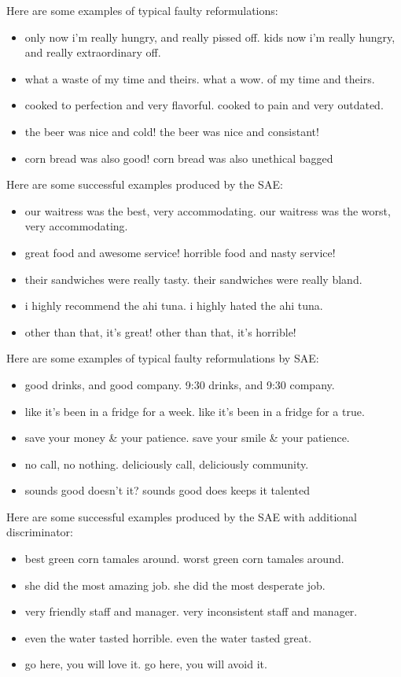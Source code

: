 \documentclass[11pt,a4paper]{article}
\begin{document}
Here are some examples of typical faulty reformulations:
\begin{itemize}
\item only now i'm really hungry, and really pissed off.   kids now i'm really hungry, and really extraordinary off.
\item what a waste of my time and theirs.  what a wow. of my time and theirs.
\item cooked to perfection and very flavorful.  cooked to pain and very outdated.
\item the beer was nice and cold!  the beer was nice and consistant!
\item corn bread was also good!  corn bread was also unethical bagged
\end{itemize}

Here are some successful examples produced by the SAE:
\begin{itemize}
\item our waitress was the best, very accommodating.  our waitress was the worst, very accommodating.
\item great food and awesome service!  horrible food and nasty service!
\item their sandwiches were really tasty.  their sandwiches were really bland.
\item i highly recommend the ahi tuna.  i highly hated the ahi tuna.
\item other than that, it's great!  other than that, it's horrible!
\end{itemize}

Here are some examples of typical faulty reformulations by SAE:
\begin{itemize}
\item good drinks, and good company.  9:30 drinks, and 9:30 company.
\item like it's been in a fridge for a week.  like it's been in a fridge for a true.
\item save your money \& your patience.  save your smile \& your patience.
\item no call, no nothing.  deliciously call, deliciously community.
\item sounds good doesn't it?  sounds good does keeps it talented
\end{itemize}

Here are some successful examples produced by the SAE with additional discriminator:
\begin{itemize}
\item best green corn tamales around.  worst green corn tamales around.
\item she did the most amazing job.  she did the most desperate job.
\item very friendly staff and manager.  very inconsistent staff and manager.
\item even the water tasted horrible.  even the water tasted great.
\item go here, you will love it.  go here, you will avoid it.
\end{itemize}
\end{document}
